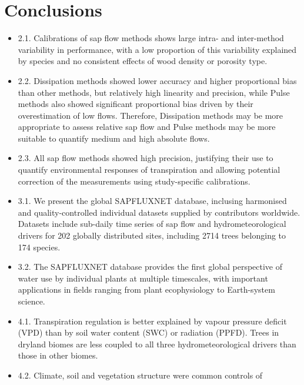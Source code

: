 \documentclass[11pt,twoside]{reedthesis}
\providecommand{\tightlist}{%
  \setlength{\itemsep}{0pt}\setlength{\parskip}{0pt}}
\begin{document}
\section{Conclusions}\label{conclusions}
\begin{itemize}
\tightlist
\item
  2.1. Calibrations of sap flow methods shows large intra- and
  inter-method variability in performance, with a low proportion of this
  variability explained by species and no consistent effects of wood
  density or porosity type.\par
\item
  2.2. Dissipation methods showed lower accuracy and higher proportional
  bias than other methods, but relatively high linearity and precision,
  while Pulse methods also showed significant proportional bias driven
  by their overestimation of low flows. Therefore, Dissipation methods
  may be more appropriate to assess relative sap flow and Pulse methods
  may be more suitable to quantify medium and high absolute flows.\par
\item
  2.3. All sap flow methods showed high precision, justifying their use
  to quantify environmental responses of transpiration and allowing
  potential correction of the measurements using study-specific
  calibrations.\par
\item
  3.1. We present the global SAPFLUXNET database, inclusing harmonised
  and quality-controlled individual datasets supplied by contributors
  worldwide. Datasets include sub-daily time series of sap flow and
  hydrometeorological drivers for 202 globally distributed sites,
  including 2714 trees belonging to 174 species.\par
\item
  3.2. The SAPFLUXNET database provides the first global perspective of
  water use by individual plants at multiple timescales, with important
  applications in fields ranging from plant ecophysiology to
  Earth-system science.\par
\item
  4.1. Transpiration regulation is better explained by vapour pressure
  deficit (VPD) than by soil water content (SWC) or radiation (PPFD).
  Trees in dryland biomes are less coupled to all three
  hydrometeorological drivers than those in other biomes.\par
\item
  4.2. Climate, soil and vegetation structure were common controls of

\end{itemize}
\end{document}

